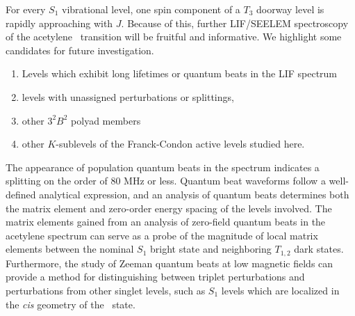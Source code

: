 \documentclass[12pt]{mitthesis}
\begin{document}
For every $S_1$ vibrational level, one spin component of a $T_3$
doorway level is rapidly approaching with $J$.  Because of this,
further LIF/SEELEM spectroscopy of the acetylene \AtoX\ transition
will be fruitful and informative.  We highlight some candidates for
future investigation.
\begin{enumerate}
\item Levels which exhibit long lifetimes or quantum beats in the LIF
  spectrum
\item levels with unassigned perturbations or splittings,
\item other $3^2B^2$ polyad members
\item other $K$-sublevels of the Franck-Condon active levels studied
  here.  
\end{enumerate}

The appearance of population quantum beats in the spectrum indicates a
splitting on the order of 80 MHz or less.  Quantum beat waveforms
follow a well-defined analytical expression, and an analysis of
quantum beats determines both the matrix element and zero-order energy
spacing of the levels involved.  The matrix elements gained from an
analysis of zero-field quantum beats in the acetylene spectrum can
serve as a probe of the magnitude of local matrix elements between the
nominal $S_1$ bright state and neighboring $T_{1,2}$ dark states.
Furthermore, the study of Zeeman quantum beats at low magnetic fields
can provide a method for distinguishing between triplet perturbations
and perturbations from other singlet levels, such as $S_1$ levels
which are localized in the \emph{cis} geometry of the \astate\ state.

 

\end{document}
